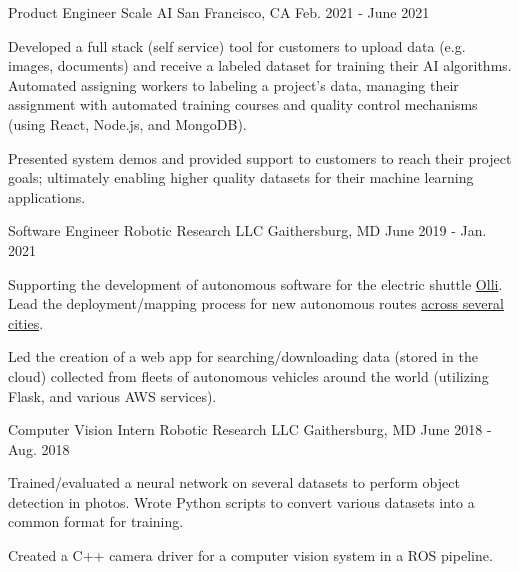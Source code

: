 
\begin{cventries}
  \cventry
    {Product Engineer} %
    {Scale AI} %
    {San Francisco, CA} %
    {Feb. 2021 - June 2021} %
    {
      \begin{cvitems} %
      \item {Developed a full stack (self service) tool for customers to upload data (e.g. images, documents) and receive a labeled dataset for training their AI algorithms.  Automated assigning workers to labeling a project's data, managing their assignment with automated training courses and quality control mechanisms (using React, Node.js, and MongoDB).}
        \item {Presented system demos and provided support to customers to reach their project goals; ultimately enabling higher quality datasets for their machine learning applications.}
      \end{cvitems}
    }

  \cventry
    {Software Engineer} %
    {Robotic Research LLC} %
    {Gaithersburg, MD} %
    {June 2019 - Jan. 2021} %
    {
      \begin{cvitems} %
        \item {Supporting the development of autonomous software for the electric 
          shuttle \href{https://localmotors.com/olli}{Olli}.  Lead the deployment/mapping process for new autonomous routes \href{https://localmotors.com/deployments}{across several cities}.}
      \item {Led the creation of a web app for searching/downloading data (stored in the cloud) collected from fleets of autonomous vehicles around the world (utilizing Flask, and various AWS services).}
      \end{cvitems}
    }

  \cventry
    {Computer Vision Intern} %
    {Robotic Research LLC} %
    {Gaithersburg, MD} %
    {June 2018 - Aug. 2018} %
    {
      \begin{cvitems} %
        \item {Trained/evaluated a neural network on several datasets to perform object detection in 
photos.  Wrote Python scripts to convert various datasets into a common format for 
training.}
        \item {Created a C++ camera driver for a computer vision system in a ROS pipeline.}
      \end{cvitems}
    }


\end{cventries}
